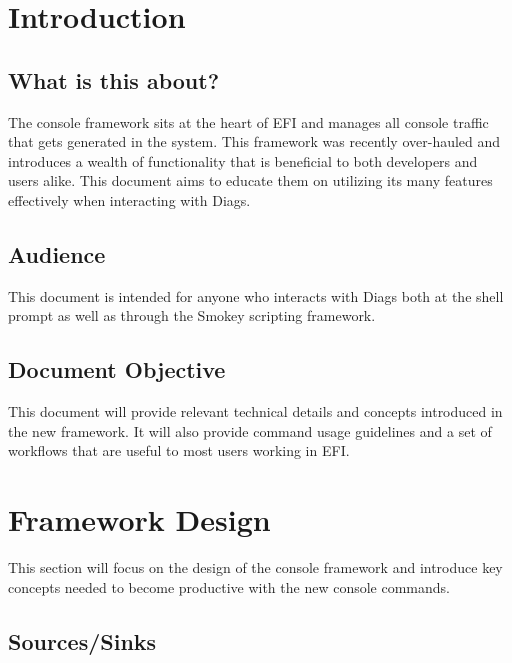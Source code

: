 \clearpage
\fancyhfoffset[l]{\BodyIndentLeft}
\fancyhfoffset[r]{0in}
{}

\section{Introduction}

\subsection{What is this about?}

The console framework sits at the heart of EFI and manages all console traffic
that gets generated in the system. This framework was recently over-hauled and introduces
a wealth of functionality that is beneficial to both developers and users alike. This document aims to educate them on utilizing 
its many features effectively when interacting with Diags.

\subsection{Audience}

This document is intended for anyone who interacts with Diags both at the shell prompt as 
well as through the Smokey scripting framework.

\subsection{Document Objective}

This document will provide relevant technical details and concepts introduced in the 
new framework. It will also provide command usage guidelines and a set of workflows that are useful to most users 
working in EFI.

\section {Framework Design}

This section will focus on the design of the console framework and introduce
key concepts needed to become productive with the new console commands. 

\subsection{Sources/Sinks}

